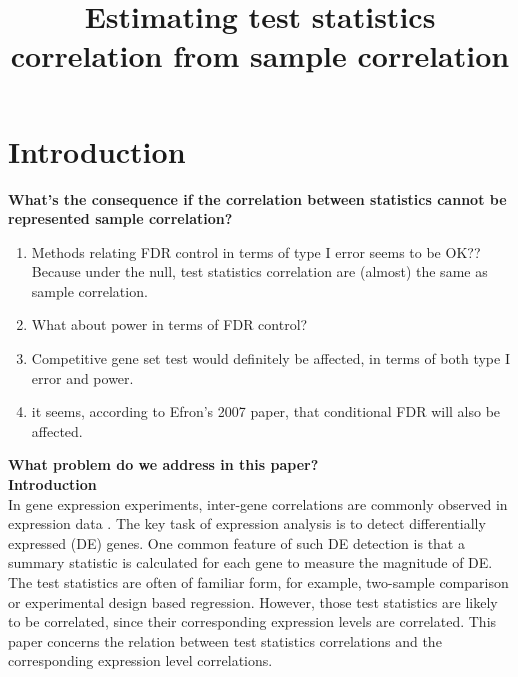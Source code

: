 \documentclass[12pt, a4paper]{article}
\title{Estimating test statistics correlation from sample correlation}
\date{} %
\begin{document}
	\maketitle
	\section{Introduction}
	\textbf{What's the consequence if the correlation between statistics cannot be represented sample correlation?}
	\begin{enumerate}
		\item Methods relating FDR control in terms of type I error seems to be OK?? Because under the null, test statistics correlation are (almost) the same as sample correlation.
		\item What about power in terms of FDR control?
		\item Competitive gene set test would definitely be affected, in terms of both type I error and power.  
		\item it seems, according to Efron's 2007 paper, that conditional FDR will also be affected. 
	\end{enumerate}
	
	\textbf{What problem do we address in this paper?}\\

	
	\textbf{Introduction}\\
	In gene expression experiments, inter-gene correlations are commonly observed in expression data \citep{efron2012large, qiu2005effects,barry2008statistical, efron2007correlation,storey2003positive, huang2013gene, wu2012camera, gatti2010heading}. The key task of expression analysis is to detect differentially expressed (DE) genes. One common feature of such DE detection is that a summary statistic is calculated for each gene to measure the magnitude of DE. The test statistics are often of familiar form, for example, two-sample comparison or experimental design based regression. However, those test statistics are likely to be correlated, since their corresponding expression levels are correlated. This paper concerns the relation between test statistics correlations and the corresponding expression level correlations.
	
\end{document}
